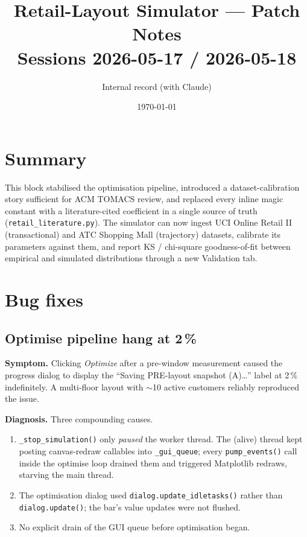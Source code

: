 \documentclass[11pt]{article}
\title{Retail-Layout Simulator --- Patch Notes \\
       \large Sessions 2026-05-17 / 2026-05-18}
\author{Internal record (with Claude)}
\date{\today}
\begin{document}
\maketitle

\section*{Summary}

This block stabilised the optimisation pipeline, introduced a
dataset-calibration story sufficient for ACM TOMACS review, and
replaced every inline magic constant with a literature-cited
coefficient in a single source of truth (\texttt{retail\_literature.py}).
The simulator can now ingest UCI Online Retail II (transactional) and
ATC Shopping Mall (trajectory) datasets, calibrate its parameters
against them, and report KS / chi-square goodness-of-fit between
empirical and simulated distributions through a new Validation tab.

\section{Bug fixes}

\subsection{Optimise pipeline hang at 2\,\%}
\label{sec:opt-hang}

\textbf{Symptom.} Clicking \emph{Optimize} after a pre-window
measurement caused the progress dialog to display the
``Saving PRE-layout snapshot (A)\dots'' label at 2\,\% indefinitely.
A multi-floor layout with $\sim$10 active customers reliably
reproduced the issue.

\textbf{Diagnosis.} Three compounding causes.
\begin{enumerate}[leftmargin=*]
  \item \texttt{\_stop\_simulation()} only \emph{paused} the worker
    thread. The (alive) thread kept posting canvas-redraw callables
    into \texttt{\_gui\_queue}; every \texttt{pump\_events()} call
    inside the optimise loop drained them and triggered Matplotlib
    redraws, starving the main thread.
  \item The optimisation dialog used \texttt{dialog.update\_idletasks()}
    rather than \texttt{dialog.update()}; the bar's value updates were
    not flushed.
  \item No explicit drain of the GUI queue before optimisation began.
\end{enumerate}
\end{document}
